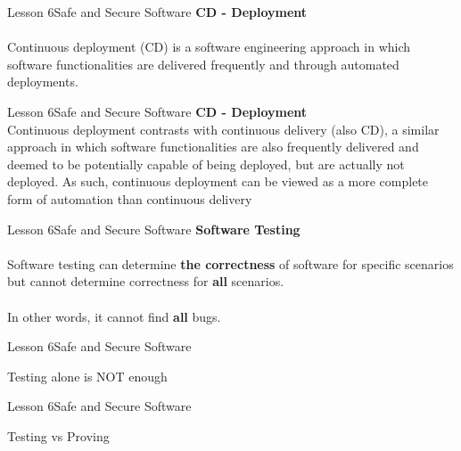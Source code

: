\documentclass[aspectratio=1610]{beamer}
\begin{document}
\begin{frame}{Lesson 6}{Safe and Secure Software}
\LARGE
\textbf{CD - Deployment}\\~\\
Continuous deployment (CD) is a software engineering approach in which software 
functionalities are delivered frequently and through automated deployments.
\end{frame}



\begin{frame}{Lesson 6}{Safe and Secure Software}
\LARGE
\textbf{CD - Deployment}\\
Continuous deployment contrasts with continuous delivery (also CD), a 
similar approach in which software functionalities are also frequently delivered and 
deemed to be potentially capable of being deployed, but are actually not deployed. 
As such, continuous deployment can be viewed as a more complete form of automation than 
continuous delivery
\end{frame}




\begin{frame}
\end{frame}


\begin{frame}{Lesson 6}{Safe and Secure Software}
\LARGE
\textbf{Software Testing}\\~\\
Software testing can determine \textbf{the correctness} of software for specific 
scenarios but cannot determine correctness for \textbf{all} scenarios.\\~\\
In other words, it cannot find \textbf{all} bugs.
\end{frame}



\begin{frame}{Lesson 6}{Safe and Secure Software}
\Huge
\begin{center}
Testing alone is NOT enough
\end{center}
\end{frame}



\begin{frame}{Lesson 6}{Safe and Secure Software}
\Huge
\begin{center}
Testing vs Proving
\end{center}
\end{frame}
\end{document}
